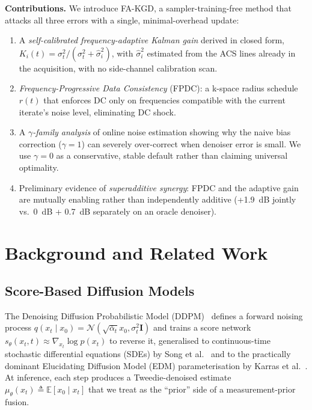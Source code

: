 \documentclass[10pt,twocolumn,letterpaper]{article}
\newcommand{\hatsig}{\hat{\sigma}}
\newcommand{\muth}{\mu_\theta}
\begin{document}
\textbf{Contributions.} We introduce FA-KGD, a sampler-training-free method that
attacks all three errors with a single, minimal-overhead update:
\begin{enumerate}
  \item A \emph{self-calibrated frequency-adaptive Kalman gain} derived in
  closed form, $K_i(t)=\sigma_t^2/(\sigma_t^2+\hatsig_i^2)$, with $\hatsig_i^2$
  estimated from the ACS lines already in the acquisition, with no side-channel
  calibration scan.
  \item \emph{Frequency-Progressive Data Consistency} (FPDC): a k-space
  radius schedule $r(t)$ that enforces DC only on frequencies compatible with
  the current iterate's noise level, eliminating DC shock.
  \item A \emph{$\gamma$-family analysis} of online noise estimation showing
  why the naive bias correction ($\gamma{=}1$) can severely over-correct when
  denoiser error is small. We use $\gamma{=}0$ as a conservative, stable
  default rather than claiming universal optimality.
  \item Preliminary evidence of \emph{superadditive synergy}: FPDC and the adaptive gain
  are mutually enabling rather than independently additive (+1.9~dB jointly
  vs.~0~dB + 0.7~dB separately on an oracle denoiser).
\end{enumerate}

\section{Background and Related Work}
\label{sec:related}

\subsection{Score-Based Diffusion Models}

The Denoising Diffusion Probabilistic Model (DDPM)~\cite{ho2020ddpm} defines
a forward noising process
$q(x_t \mid x_0)\!=\!\mathcal{N}(\sqrt{\bar{\alpha}_t} x_0, \sigma_t^2
\mathbf{I})$ and trains a score network $s_\theta(x_t, t)\!\approx\!
\nabla_{x_t} \log p(x_t)$ to reverse it, generalised to continuous-time
stochastic differential equations (SDEs) by Song et al.~\cite{song2021score}
and to the practically dominant Elucidating Diffusion Model (EDM)
parameterisation by Karras et al.~\cite{karras2022edm}. At inference, each
step produces a Tweedie-denoised estimate
$\muth(x_t) \!\triangleq\!\mathbb{E}[x_0\mid x_t]$ that we treat as the ``prior''
side of a measurement-prior fusion.
\end{document}
